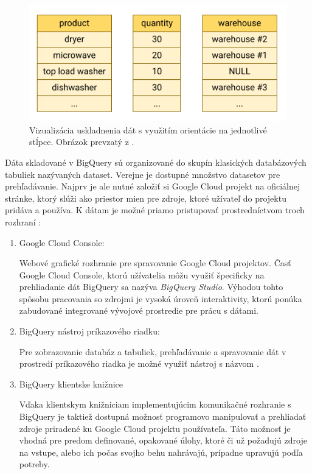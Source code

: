 \begin{figure}[htb]
\begin{center}
 \includegraphics[scale=0.7]{obrazky-figures/column-oriented-store.png}
 \caption{Vizualizácia uskladnenia dát s využitím orientácie na jednotlivé stĺpce. Obrázok prevzatý z \cite{google-bq-storage}.}
 \label{img:column-oriented-store}
\end{center}
\end{figure}

\pagebreak

Dáta skladované v BigQuery sú organizované do skupín klasických databázových tabuliek nazývaných dataset.
Verejne je dostupné množstvo datasetov pre prehľadávanie.
Najprv je ale nutné založiť si Google Cloud projekt na oficiálnej stránke, ktorý slúži ako priestor mien pre zdroje, ktoré užívateľ do projektu pridáva a používa.
K dátam je možné priamo pristupovať prostredníctvom troch rozhraní \cite{google-bq}:
\begin{enumerate}
    \item Google Cloud Console:

    Webové grafické rozhranie pre spravovanie Google Cloud projektov. 
    Časť Google Cloud Console, ktorú užívatelia môžu využiť špecificky na prehliadanie dát BigQuery sa nazýva \emph{BigQuery Studio}.
    Výhodou tohto spôsobu pracovania so zdrojmi je vysoká úroveň interaktivity, ktorú ponúka zabudované integrované vývojové prostredie pre prácu s dátami. 

    \item BigQuery nástroj príkazového riadku:

    Pre zobrazovanie databáz a tabuliek, prehľadávanie a spravovanie dát v prostredí príkazového riadka je možné využiť nástroj s názvom . 
    
    \item BigQuery klientske knižnice

    Vďaka klientskym knižniciam implementujúcim komunikačné rozhranie s BigQuery je taktiež dostupná možnosť programovo manipulovať a prehliadať zdroje priradené ku Google Cloud projektu používateľa.
    Táto možnosť je vhodná pre predom definované, opakované úlohy, ktoré či už požadujú zdroje na vstupe, alebo ich počas svojho behu nahrávajú, prípadne upravujú podľa potreby.
\end{enumerate}

